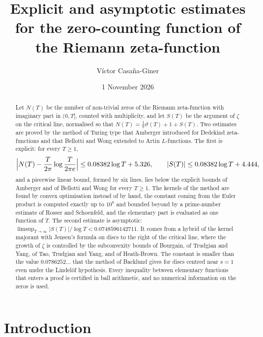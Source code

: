 \documentclass[11pt,reqno]{amsart}
\title[Explicit and asymptotic estimates for $N(T)$]{Explicit and asymptotic estimates for the zero-counting function of the Riemann zeta-function}
\author{V\'ictor Casa\~na-Giner}
\date{1 November 2026}
\numberwithin{equation}{section}
\theoremstyle{definition}
\theoremstyle{remark}
\newcommand{\LineBAone}{0.08382}
\newcommand{\LineBAthreeN}{5.326}
\newcommand{\LineBAthreeS}{4.444}
\newcommand{\CHup}{0.0748596142711}
\begin{document}
\begin{abstract}
Let $N(T)$ be the number of non-trivial zeros of the Riemann zeta-function with imaginary part in $(0,T]$, counted with multiplicity, and let $S(T)$ be the argument of $\zeta$ on the critical line, normalised so that $N(T)=\frac1\pi\vartheta(T)+1+S(T)$. Two estimates are proved by the method of Turing type that Amberger introduced for Dedekind zeta-functions and that Bellotti and Wong extended to Artin $L$-functions. The first is explicit: for every $T\ge1$,
\[
\Bigl|N(T)-\frac T{2\pi}\log\frac T{2\pi e}\Bigr|\le\LineBAone\log T+\LineBAthreeN,\qquad |S(T)|\le\LineBAone\log T+\LineBAthreeS,
\]
and a piecewise linear bound, formed by six lines, lies below the explicit bounds of Amberger and of Bellotti and Wong for every $T\ge1$. The kernels of the method are found by convex optimisation instead of by hand, the constant coming from the Euler product is computed exactly up to $10^8$ and bounded beyond by a prime-number estimate of Rosser and Schoenfeld, and the elementary part is evaluated as one function of $T$. The second estimate is asymptotic: $\limsup_{T\to\infty}|S(T)|/\log T<\CHup$. It comes from a hybrid of the kernel majorant with Jensen's formula on discs to the right of the critical line, where the growth of $\zeta$ is controlled by the subconvexity bounds of Bourgain, of Trudgian and Yang, of Tao, Trudgian and Yang, and of Heath-Brown. The constant is smaller than the value $0.0786252\ldots$ that the method of Backlund gives for discs centred near $s=1$ even under the Lindel\"of hypothesis. Every inequality between elementary functions that enters a proof is certified in ball arithmetic, and no numerical information on the zeros is used.
\end{abstract}

\maketitle
\tableofcontents

\section{Introduction}\label{sec:intro}
\end{document}
